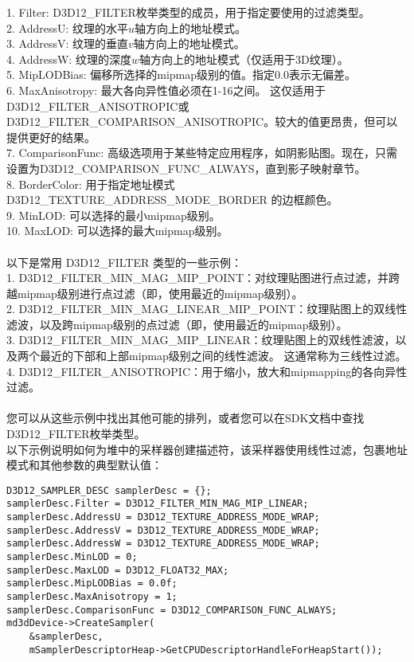 \begin{flushleft}
1. Filter: D3D12\_FILTER枚举类型的成员，用于指定要使用的过滤类型。\\
2. AddressU: 纹理的水平$u$轴方向上的地址模式。\\
3. AddressV: 纹理的垂直$v$轴方向上的地址模式。\\
4. AddressW: 纹理的深度$w$轴方向上的地址模式（仅适用于3D纹理）。\\
5. MipLODBias: 偏移所选择的mipmap级别的值。指定0.0表示无偏差。\\
6. MaxAnisotropy: 最大各向异性值必须在1-16之间。 这仅适用于D3D12\_FILTER\_ANISOTROPIC或D3D12\_FILTER\_COMPARISON\_ANISOTROPIC。较大的值更昂贵，但可以提供更好的结果。\\
7. ComparisonFunc: 高级选项用于某些特定应用程序，如阴影贴图。现在，只需设置为D3D12\_COMPARISON\_FUNC\_ALWAYS，直到影子映射章节。\\
8. BorderColor: 用于指定地址模式 D3D12\_TEXTURE\_ADDRESS\_MODE\_BORDER 的边框颜色。\\
9. MinLOD: 可以选择的最小mipmap级别。\\
10. MaxLOD: 可以选择的最大mipmap级别。\\
~\\
以下是常用 D3D12\_FILTER 类型的一些示例：\\
1. D3D12\_FILTER\_MIN\_MAG\_MIP\_POINT：对纹理贴图进行点过滤，并跨越mipmap级别进行点过滤（即，使用最近的mipmap级别）。\\
2. D3D12\_FILTER\_MIN\_MAG\_LINEAR\_MIP\_POINT：纹理贴图上的双线性滤波，以及跨mipmap级别的点过滤（即，使用最近的mipmap级别）。\\
3. D3D12\_FILTER\_MIN\_MAG\_MIP\_LINEAR：纹理贴图上的双线性滤波，以及两个最近的下部和上部mipmap级别之间的线性滤波。 这通常称为三线性过滤。\\
4. D3D12\_FILTER\_ANISOTROPIC：用于缩小，放大和mipmapping的各向异性过滤。\\
~\\

您可以从这些示例中找出其他可能的排列，或者您可以在SDK文档中查找D3D12\_FILTER枚举类型。\\

以下示例说明如何为堆中的采样器创建描述符，该采样器使用线性过滤，包裹地址模式和其他参数的典型默认值：\\
\end{flushleft}

\begin{lstlisting}
D3D12_SAMPLER_DESC samplerDesc = {};
samplerDesc.Filter = D3D12_FILTER_MIN_MAG_MIP_LINEAR;
samplerDesc.AddressU = D3D12_TEXTURE_ADDRESS_MODE_WRAP;
samplerDesc.AddressV = D3D12_TEXTURE_ADDRESS_MODE_WRAP;
samplerDesc.AddressW = D3D12_TEXTURE_ADDRESS_MODE_WRAP;
samplerDesc.MinLOD = 0;
samplerDesc.MaxLOD = D3D12_FLOAT32_MAX;
samplerDesc.MipLODBias = 0.0f;
samplerDesc.MaxAnisotropy = 1;
samplerDesc.ComparisonFunc = D3D12_COMPARISON_FUNC_ALWAYS;
md3dDevice->CreateSampler(
    &samplerDesc,
    mSamplerDescriptorHeap->GetCPUDescriptorHandleForHeapStart());
\end{lstlisting}

